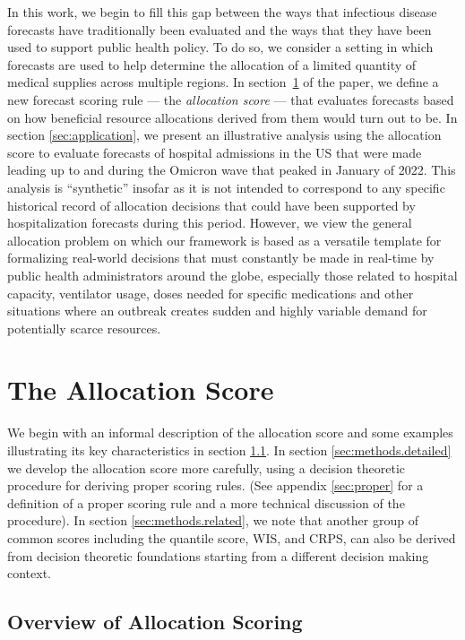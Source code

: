 \documentclass{article}\usepackage[]{graphicx}\usepackage[]{xcolor}
\begin{document}
In this work, we begin to fill this gap between the ways that infectious disease forecasts have traditionally been
evaluated and the ways that they have been used to support public health policy. To do so, we consider a setting in
which forecasts are used to help determine the allocation of a limited quantity of medical supplies across multiple
regions. In section~\ref{sec:methods} of the paper, we define a new forecast scoring rule --- the {\em allocation score}
--- that evaluates forecasts based on how beneficial resource allocations derived from them would turn out to be. In
section \ref{sec:application}, we present an illustrative analysis using the allocation score to evaluate forecasts of
hospital admissions in the US that were made leading up to and during the Omicron wave that peaked in January of 2022.
This analysis is ``synthetic'' insofar as it is not intended to correspond to any specific historical record of
allocation decisions that could have been supported by hospitalization forecasts during this period. However, we view
the general allocation problem on which our framework is based as a versatile template for formalizing real-world
decisions that must constantly be made in real-time by public health administrators around the globe, especially those
related to hospital capacity, ventilator usage, doses needed for specific medications and other situations where an
outbreak creates sudden and highly variable demand for potentially scarce resources.  

\section{The Allocation Score}
\label{sec:methods}

We begin with an informal description of the allocation score and some examples illustrating its key characteristics in
section \ref{sec:methods.overview}. In section \ref{sec:methods.detailed} we develop the allocation score more
carefully, using a decision theoretic procedure for deriving proper scoring rules. (See appendix \ref{sec:proper}
for a definition of a proper scoring rule and a more technical discussion of the procedure). In section
\ref{sec:methods.related}, we note that another group of common scores including the quantile score, WIS, and CRPS, can
also be derived from decision theoretic foundations \textemdash starting from a different decision making context.

\subsection{Overview of Allocation Scoring}
\label{sec:methods.overview}
\end{document}
